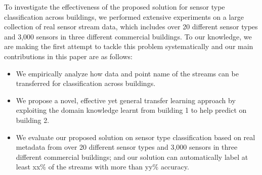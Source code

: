 To investigate the effectiveness of the proposed solution for sensor type 
classification across buildings, we performed extensive experiments on a large 
collection of real sensor stream data, which includes over 20 different sensor types 
and 3,000 sensors in three different commercial buildings. To our knowledge, we are 
making the first attempt to tackle this problem systematically and our main 
contributions in this paper are as follows:

\begin{itemize}\itemsep1pt \parskip1pt 
\item We empirically analyze how data and point name of the streams can be transferred for classification across buildings.
\item We propose a novel, effective yet general transfer learning approach by exploiting the domain knowledge learnt from building 1 to help predict on building 2.
\item We evaluate our proposed solution on sensor type classification based on real metadata from over 20 different sensor types and 3,000 sensors in three different commercial buildings; and our solution can automatically label at least xx\% of the streams with more than yy\% accuracy.
\end{itemize}